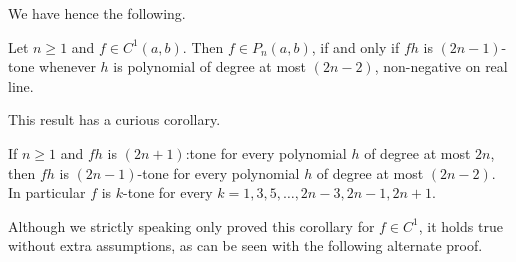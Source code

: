 We have hence the following.

\begin{lause}
	Let $n \geq 1$ and $f \in C^{1}(a, b)$. Then $f \in P_{n}(a, b)$, if and only if $f h$ is $(2 n - 1)$-tone whenever $h$ is polynomial of degree at most $(2 n - 2)$, non-negative on real line. 
\end{lause}

This result has a curious corollary.

\begin{kor}\label{k_tone_cor}
	If $n \geq 1$ and $f h$ is $(2 n + 1)$:tone for every polynomial $h$ of degree at most $2 n$, then $f h$ is $(2 n - 1)$-tone for every polynomial $h$ of degree at most $(2 n - 2)$. In particular $f$ is $k$-tone for every $k = 1, 3, 5, \ldots, 2n - 3, 2 n - 1, 2n + 1$.
\end{kor}
Although we strictly speaking only proved this corollary for $f \in C^{1}$, it holds true without extra assumptions, as can be seen with the following alternate proof.


